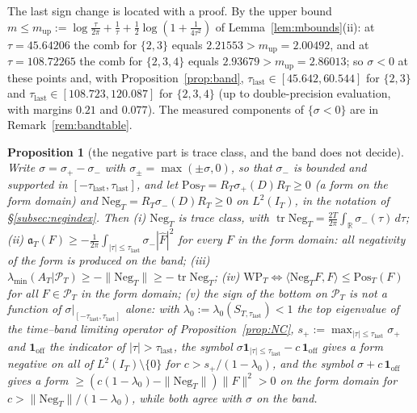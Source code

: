 \documentclass[11pt]{amsart}
\newtheorem{proposition}[theorem]{Proposition}
\theoremstyle{definition}
\theoremstyle{remark}
\newcommand{\R}{\mathbb R}
\newcommand{\PT}{\mathcal P_T}
\newcommand{\IT}{I_T}
\newcommand{\lamA}{\lambda_{\min}(A_T|\PT)}
\newcommand{\Fh}{\widehat F}
\begin{document}
The last sign change is located with a proof. By the upper bound
$m\le m_{\mathrm{up}}:=\log\frac\tau{2\pi}+\frac1\tau+\frac12\log(1+\frac1{4\tau^2})$ of
Lemma~\ref{lem:mbounds}(ii): at $\tau=45.64206$ the comb for $\{2,3\}$ equals $2.21553>m_{\mathrm{up}}=2.00492$,
and at $\tau=108.72265$ the comb for $\{2,3,4\}$ equals $2.93679>m_{\mathrm{up}}=2.86013$; so $\sigma<0$ at these
points and, with Proposition~\ref{prop:band}, $\tau_{\mathrm{last}}\in[45.642,60.544]$ for $\{2,3\}$ and
$\tau_{\mathrm{last}}\in[108.723,120.087]$ for $\{2,3,4\}$ (up to double-precision evaluation, with margins
$0.21$ and $0.077$). The measured components of $\{\sigma<0\}$ are in Remark~\ref{rem:bandtable}.

\begin{proposition}[the negative part is trace class, and the band does not decide]\label{prop:negtrace}
Write $\sigma=\sigma_+-\sigma_-$ with $\sigma_\pm=\max(\pm\sigma,0)$, so that $\sigma_-$ is bounded and supported in
$[-\tau_{\mathrm{last}},\tau_{\mathrm{last}}]$, and let $\mathrm{Pos}_T=R_T\sigma_+(D)R_T\ge0$ (a form on the form
domain) and $\mathrm{Neg}_T=R_T\sigma_-(D)R_T\ge0$ on $L^2(\IT)$, in the notation of \S\ref{subsec:negindex}. Then
\emph{(i)} $\mathrm{Neg}_T$ is trace class, with $\operatorname{tr}\mathrm{Neg}_T=\frac{2T}{2\pi}\int_\R\sigma_-(\tau)\,d\tau$;
\emph{(ii)} $\mathfrak a_T(F)\ge-\frac1{2\pi}\int_{|\tau|\le\tau_{\mathrm{last}}}\sigma_-|\Fh|^2$ for every $F$ in the
form domain: all negativity of the form is produced on the band;
\emph{(iii)} $\lamA\ge-\|\mathrm{Neg}_T\|\ge-\operatorname{tr}\mathrm{Neg}_T$;
\emph{(iv)} $\mathrm{WP}_T\iff\langle\mathrm{Neg}_TF,F\rangle\le\mathrm{Pos}_T(F)$ for all $F\in\PT$ in the form domain;
\emph{(v)} the sign of the bottom on $\PT$ is not a function of $\sigma|_{[-\tau_{\mathrm{last}},\tau_{\mathrm{last}}]}$
alone: with $\lambda_0:=\lambda_0(S_{T,\tau_{\mathrm{last}}})<1$ the top eigenvalue of the time--band limiting
operator of Proposition~\ref{prop:NC}, $s_+:=\max_{|\tau|\le\tau_{\mathrm{last}}}\sigma_+$ and $\mathbf 1_{\mathrm{off}}$ the
indicator of $|\tau|>\tau_{\mathrm{last}}$, the symbol $\sigma\mathbf 1_{|\tau|\le\tau_{\mathrm{last}}}-c\,\mathbf 1_{\mathrm{off}}$
gives a form negative on all of $L^2(\IT)\setminus\{0\}$ for $c>s_+/(1-\lambda_0)$, and the symbol
$\sigma+c\,\mathbf 1_{\mathrm{off}}$ gives a form $\ge(c(1-\lambda_0)-\|\mathrm{Neg}_T\|)\|F\|^2>0$ on the form domain for
$c>\|\mathrm{Neg}_T\|/(1-\lambda_0)$, while both agree with $\sigma$ on the band.
\end{proposition}
\end{document}
